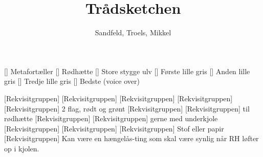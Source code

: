 \documentclass[a4paper,11pt]{article}
\title{Trådsketchen}
\author{Sandfeld, Troels, Mikkel}
\begin{document}
\maketitle

\begin{roles}
	 Metafortæller
	 Rødhætte
	 Store stygge ulv
	 Første lille gris
	 Anden lille gris
	 Tredje lille gris
	 Bedste (voice over)
\end{roles}

\begin{props}
	[Rekvisitgruppen]
	[Rekvisitgruppen]
	[Rekvisitgruppen]
	[Rekvisitgruppen]
	[Rekvisitgruppen] 2 flag, rødt og grønt
	[Rekvisitgruppen]
	[Rekvisitgruppen] til rødhætte
	[Rekvisitgruppen]
	[Rekvisitgruppen] gerne med underkjole
	[Rekvisitgruppen]
	[Rekvisitgruppen]
	[Rekvisitgruppen] Stof eller papir
	[Rekvisitgruppen] Kan være en hængelås-ting som skal være synlig når RH løfter op i kjolen.
\end{props}
\end{document}
